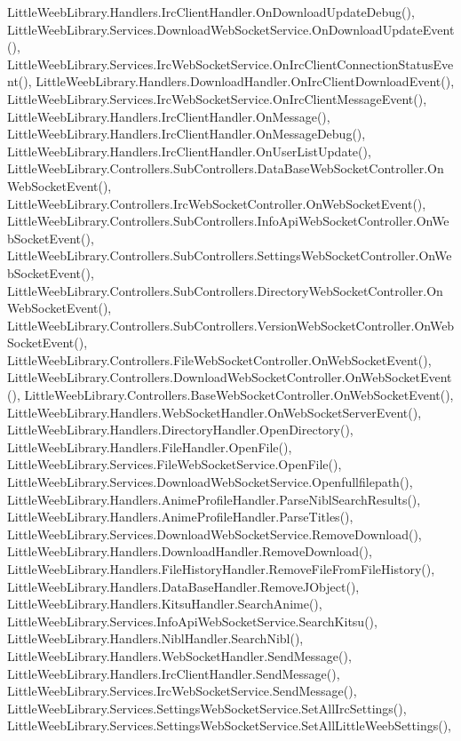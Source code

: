 Little\+Weeb\+Library.\+Handlers.\+Irc\+Client\+Handler.\+On\+Download\+Update\+Debug(), Little\+Weeb\+Library.\+Services.\+Download\+Web\+Socket\+Service.\+On\+Download\+Update\+Event(), Little\+Weeb\+Library.\+Services.\+Irc\+Web\+Socket\+Service.\+On\+Irc\+Client\+Connection\+Status\+Event(), Little\+Weeb\+Library.\+Handlers.\+Download\+Handler.\+On\+Irc\+Client\+Download\+Event(), Little\+Weeb\+Library.\+Services.\+Irc\+Web\+Socket\+Service.\+On\+Irc\+Client\+Message\+Event(), Little\+Weeb\+Library.\+Handlers.\+Irc\+Client\+Handler.\+On\+Message(), Little\+Weeb\+Library.\+Handlers.\+Irc\+Client\+Handler.\+On\+Message\+Debug(), Little\+Weeb\+Library.\+Handlers.\+Irc\+Client\+Handler.\+On\+User\+List\+Update(), Little\+Weeb\+Library.\+Controllers.\+Sub\+Controllers.\+Data\+Base\+Web\+Socket\+Controller.\+On\+Web\+Socket\+Event(), Little\+Weeb\+Library.\+Controllers.\+Irc\+Web\+Socket\+Controller.\+On\+Web\+Socket\+Event(), Little\+Weeb\+Library.\+Controllers.\+Sub\+Controllers.\+Info\+Api\+Web\+Socket\+Controller.\+On\+Web\+Socket\+Event(), Little\+Weeb\+Library.\+Controllers.\+Sub\+Controllers.\+Settings\+Web\+Socket\+Controller.\+On\+Web\+Socket\+Event(), Little\+Weeb\+Library.\+Controllers.\+Sub\+Controllers.\+Directory\+Web\+Socket\+Controller.\+On\+Web\+Socket\+Event(), Little\+Weeb\+Library.\+Controllers.\+Sub\+Controllers.\+Version\+Web\+Socket\+Controller.\+On\+Web\+Socket\+Event(), Little\+Weeb\+Library.\+Controllers.\+File\+Web\+Socket\+Controller.\+On\+Web\+Socket\+Event(), Little\+Weeb\+Library.\+Controllers.\+Download\+Web\+Socket\+Controller.\+On\+Web\+Socket\+Event(), Little\+Weeb\+Library.\+Controllers.\+Base\+Web\+Socket\+Controller.\+On\+Web\+Socket\+Event(), Little\+Weeb\+Library.\+Handlers.\+Web\+Socket\+Handler.\+On\+Web\+Socket\+Server\+Event(), Little\+Weeb\+Library.\+Handlers.\+Directory\+Handler.\+Open\+Directory(), Little\+Weeb\+Library.\+Handlers.\+File\+Handler.\+Open\+File(), Little\+Weeb\+Library.\+Services.\+File\+Web\+Socket\+Service.\+Open\+File(), Little\+Weeb\+Library.\+Services.\+Download\+Web\+Socket\+Service.\+Openfullfilepath(), Little\+Weeb\+Library.\+Handlers.\+Anime\+Profile\+Handler.\+Parse\+Nibl\+Search\+Results(), Little\+Weeb\+Library.\+Handlers.\+Anime\+Profile\+Handler.\+Parse\+Titles(), Little\+Weeb\+Library.\+Services.\+Download\+Web\+Socket\+Service.\+Remove\+Download(), Little\+Weeb\+Library.\+Handlers.\+Download\+Handler.\+Remove\+Download(), Little\+Weeb\+Library.\+Handlers.\+File\+History\+Handler.\+Remove\+File\+From\+File\+History(), Little\+Weeb\+Library.\+Handlers.\+Data\+Base\+Handler.\+Remove\+J\+Object(), Little\+Weeb\+Library.\+Handlers.\+Kitsu\+Handler.\+Search\+Anime(), Little\+Weeb\+Library.\+Services.\+Info\+Api\+Web\+Socket\+Service.\+Search\+Kitsu(), Little\+Weeb\+Library.\+Handlers.\+Nibl\+Handler.\+Search\+Nibl(), Little\+Weeb\+Library.\+Handlers.\+Web\+Socket\+Handler.\+Send\+Message(), Little\+Weeb\+Library.\+Handlers.\+Irc\+Client\+Handler.\+Send\+Message(), Little\+Weeb\+Library.\+Services.\+Irc\+Web\+Socket\+Service.\+Send\+Message(), Little\+Weeb\+Library.\+Services.\+Settings\+Web\+Socket\+Service.\+Set\+All\+Irc\+Settings(), Little\+Weeb\+Library.\+Services.\+Settings\+Web\+Socket\+Service.\+Set\+All\+Little\+Weeb\+Settings(), 